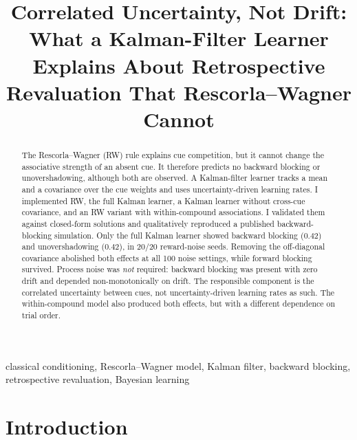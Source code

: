 \documentclass[conference,a4paper]{IEEEtran}
\begin{document}
\title{Correlated Uncertainty, Not Drift: What a Kalman-Filter Learner Explains
About Retrospective Revaluation That Rescorla--Wagner Cannot}

\author{
}

\maketitle

\begin{abstract}
The Rescorla--Wagner (RW) rule explains cue competition, but it cannot change
the associative strength of an absent cue. It therefore predicts no backward
blocking or unovershadowing, although both are observed. A Kalman-filter learner
tracks a mean and a covariance over the cue weights and uses uncertainty-driven
learning rates. I implemented RW, the full Kalman learner, a Kalman learner without
cross-cue covariance, and an RW variant with within-compound associations. I
validated them against closed-form solutions and qualitatively reproduced a
published backward-blocking simulation. Only the full Kalman learner showed
backward blocking ($0.42$) and unovershadowing ($0.42$), in 20/20 reward-noise
seeds. Removing the off-diagonal covariance abolished both effects at all 100 noise
settings, while forward blocking survived. Process noise was \emph{not} required:
backward blocking was present with zero drift and depended non-monotonically on
drift. The responsible component is the correlated uncertainty between cues, not
uncertainty-driven learning rates as such. The within-compound model also produced
both effects, but with a different dependence on trial order.
\end{abstract}

\begin{IEEEkeywords}
classical conditioning, Rescorla--Wagner model, Kalman filter, backward blocking,
retrospective revaluation, Bayesian learning
\end{IEEEkeywords}

\section{Introduction}
\end{document}
